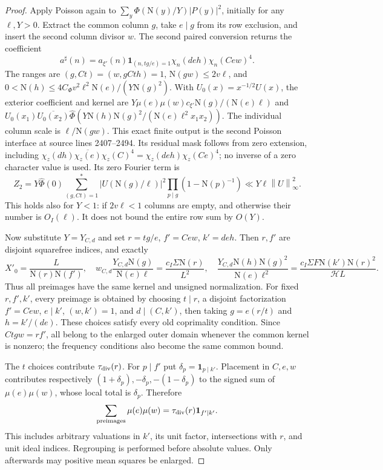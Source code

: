 \documentclass[11pt]{article}
\numberwithin{equation}{section}
\theoremstyle{definition}
\theoremstyle{remark}
\newcommand{\N}{\mathrm N}
\newcommand{\norm}[1]{\left\|#1\right\|}
\begin{document}
\begin{proof}
Apply Poisson again to $\sum_y\Phi(\N(y)/Y)|P(y)|^2$, initially for any
$\ell,Y>0$. Extract the common column $g$, take $e\mid g$ from its row
exclusion, and insert the second column divisor $w$. The second paired
conversion returns the coefficient
\[
 a^\sharp(n)=a_{\xi'}(n)\mathbf1_{(n,tg/e)=1}
                      \chi_n(deh)\chi_n(Cew)^4.
\]
The ranges are $(g,Ct)=(w,gCth)=1$,
$\N(gw)\le2v\ell$, and
$0<\N(h)\le4C_\Phi v^2\ell^2\N(e)/(Y\N(g)^2)$.
With $U_0(x)=x^{-1/2}U(x)$, the exterior coefficient and kernel are
$Y\mu(e)\mu(w)c_{\xi'}\N(g)/(\N(e)\ell)$ and
$U_0(x_1)\overline{U_0(x_2)}
\widehat\Phi(Y\N(h)\N(g)^2/(\N(e)\ell^2x_1x_2))$.
The individual column scale is $\ell/\N(gw)$. This exact finite output
is the second Poisson interface at source lines 2407--2494. Its residual
mask follows from zero extension, including
$\chi_z(dh)\overline{\chi_z(e)}\chi_z(C)^4
=\chi_z(deh)\chi_z(Ce)^4$; no inverse of a zero character value is used.
Its zero Fourier term is
\[
 Z_2=Y\widehat\Phi(0)\sum_{(g,Ct)=1}^*
 |U(\N(g)/\ell)|^2\prod_{p\mid g}(1-\N(p)^{-1})
 \ll Y\ell\norm{U}_\infty^2.
\]
This holds also for $Y<1$: if $2v\ell<1$ columns are empty, and otherwise
their number is $O_I(\ell)$. It does not bound the entire row sum by $O(Y)$.

Now substitute $Y=Y_{C,d}$ and set $r=tg/e$, $f'=Cew$, $k'=deh$.
Then $r,f'$ are disjoint squarefree indices, and exactly
\begin{equation}\label{eq:transfer-common-normalization}
 X'_0=\frac L{\N(r)\N(f')},\quad
 w_{C,d}\frac{Y_{C,d}\N(g)}{\N(e)\ell}
 =\frac{c_I\Sigma\N(r)}{L^2},\quad
 \frac{Y_{C,d}\N(h)\N(g)^2}{\N(e)\ell^2}
 =\frac{c_I\Sigma F\N(k')\N(r)^2}{\mathcal HL}.
\end{equation}
Thus all preimages have the same kernel and unsigned normalization.
For fixed $r,f',k'$, every preimage is obtained by choosing
$t\mid r$, a disjoint factorization $f'=Cew$, $e\mid k'$,
$(w,k')=1$, and $d\mid(C,k')$, then taking $g=e(r/t)$ and $h=k'/(de)$.
These choices satisfy every old coprimality condition. Since
$Ctgw=rf'$, all belong to the enlarged outer domain whenever the common
kernel is nonzero; the frequency conditions also become the same common bound.

The $t$ choices contribute $\tau_{\rm div}(r)$. For $p\mid f'$ put
$\delta_p=\mathbf1_{p\mid k'}$. Placement in $C,e,w$ contributes respectively
$(1+\delta_p),-\delta_p,-(1-\delta_p)$ to the signed sum of
$\mu(e)\mu(w)$, whose local total is $\delta_p$. Therefore
\[
 \sum_{\text{preimages}}\mu(e)\mu(w)
 =\tau_{\rm div}(r)\mathbf1_{f'\mid k'}.
\]
This includes arbitrary valuations in $k'$, its unit factor, intersections
with $r$, and unit ideal indices. Regrouping is performed before absolute
values. Only afterwards may positive mean squares be enlarged.


\end{proof}
\end{document}
